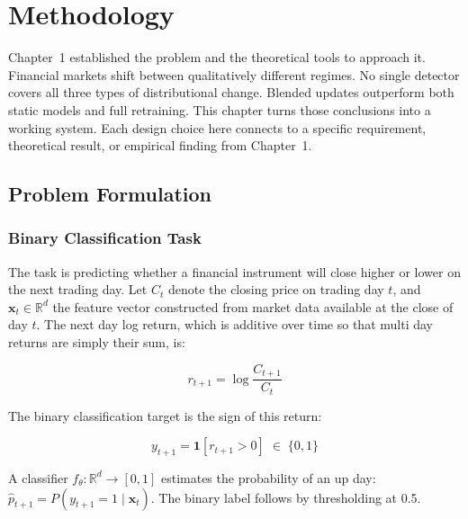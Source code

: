 
\chapter{Methodology}
\label{ch:methodology}

Chapter~1 established the problem and the theoretical tools to approach it. Financial markets shift between qualitatively different regimes. No single detector covers all three types of distributional change. Blended updates outperform both static models and full retraining. This chapter turns those conclusions into a working system. Each design choice here connects to a specific requirement, theoretical result, or empirical finding from Chapter~1.

\section{Problem Formulation}
\label{sec:problem_formulation}

\subsection{Binary Classification Task}

The task is predicting whether a financial instrument will close higher or lower on the next trading day. Let $C_t$ denote the closing price on trading day $t$, and $\mathbf{x}_t \in \mathbb{R}^d$ the feature vector constructed from market data available at the close of day $t$. The next day log return, which is additive over time so that multi day returns are simply their sum, is:

\begin{equation}
  r_{t+1} = \log \frac{C_{t+1}}{C_t}
  \label{eq:log_return}
\end{equation}

The binary classification target is the sign of this return:

\begin{equation}
  y_{t+1} = \mathbf{1}[r_{t+1} > 0] \;\in\; \{0, 1\}
  \label{eq:target}
\end{equation}

A classifier $f_\theta : \mathbb{R}^d \to [0,1]$ estimates the probability of an up day: $\hat{p}_{t+1} = P(y_{t+1} = 1 \mid \mathbf{x}_t)$. The binary label follows by thresholding at 0.5.

